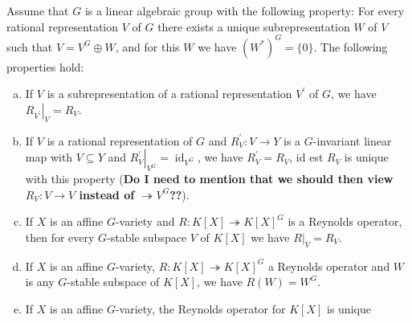 \begin{lemma}\label{lamm}
  Assume that $G$ is a linear algebraic group with the following property:
  For every rational representation $V$ of $G$ there exists a unique subrepresentation $W$ of $V$ such that $V = V^G \oplus W$, and for this $W$ we have $(W^\ast)^G = \{0\}$.
  The following properties hold:
  \begin{enumerate}[(a)]
  \item If $V$ is a subrepresentation of a rational representation $V^\prime$ of $G$, we have $\left. R_{V^\prime} \right|_V = R_V$.
  \item If $V$ is a rational representation of $G$ and $R^\prime_V \colon V \longrightarrow Y$ is a $G$-invariant linear map with $V \subseteq Y$ and $ \left. R^\prime_V \right|_{V^G} = \operatorname{id}_{V^G}$, we have $R^\prime_V = R_V$, id est $R_V$ is unique with this property (\textbf{Do I need to mention that we should then view $R_V \colon V \longrightarrow V$ instead of $ \twoheadrightarrow V^G$??}).
  \item If $X$ is an affine $G$-variety and $R \colon K[X] \twoheadrightarrow K[X]^G$ is a Reynolds operator, then for every $G$-stable subspace $V$ of $K[X]$ we have $\left. R \right|_V = R_V$.
  \item If $X$ is an affine $G$-variety, $R \colon K[X] \twoheadrightarrow K[X]^G$ a Reynolds operator and $W$ is any $G$-stable subspace of $K[X]$, we have $R(W) = W^G$.
  \item If $X$ is an affine $G$-variety, the Reynolds operator for $K[X]$ is unique
  \end{enumerate}
\end{lemma}

